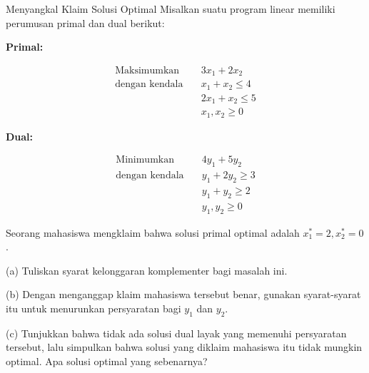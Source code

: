 \begin{ex}{Menyangkal Klaim Solusi Optimal}{}
\label{ex:cs-claimed-optimal}
 Misalkan suatu program linear memiliki perumusan primal dan dual berikut:

\textbf{Primal:}

$$
\begin{aligned}
\text{Maksimumkan} \quad & 3x_1 + 2x_2 \\
\text{dengan kendala} \quad & x_1 + x_2 \leq 4 \\
& 2x_1 + x_2 \leq 5 \\
& x_1, x_2 \geq 0
\end{aligned}
$$

\textbf{Dual:}

$$
\begin{aligned}
\text{Minimumkan} \quad & 4y_1 + 5y_2 \\
\text{dengan kendala} \quad & y_1 + 2y_2 \geq 3 \\
& y_1 + y_2 \geq 2 \\
& y_1, y_2 \geq 0
\end{aligned}
$$

Seorang mahasiswa mengklaim bahwa solusi primal optimal adalah $x_1^* = 2, x_2^* = 0$.

(a) Tuliskan syarat kelonggaran komplementer bagi masalah ini.

(b) Dengan menganggap klaim mahasiswa tersebut benar, gunakan syarat-syarat itu untuk menurunkan persyaratan bagi $y_1$ dan $y_2$.

(c) Tunjukkan bahwa tidak ada solusi dual layak yang memenuhi persyaratan tersebut, lalu simpulkan bahwa solusi yang diklaim mahasiswa itu tidak mungkin optimal. Apa solusi optimal yang sebenarnya?
\end{ex}


